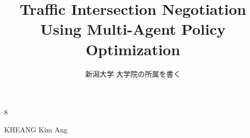 



\begin{toppage}
  \title{Traffic Intersection Negotiation Using Multi-Agent Policy Optimization}{8}


  \author{新潟大学 大学院の所属を書く }{KHEANG Kim Ang}
\end{toppage}



\contents
\listoffigures
\listoftables







% 





